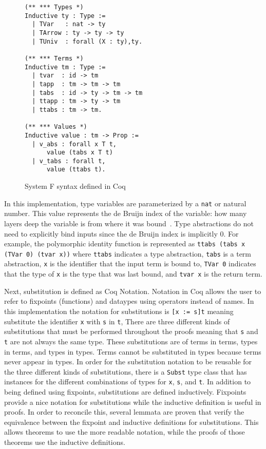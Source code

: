 \documentclass{sig-alternate}
\begin{document}
\begin{figure}[h!]
\begin{lstlisting}
(** *** Types *)
Inductive ty : Type := 
  | TVar   : nat -> ty 
  | TArrow : ty -> ty -> ty
  | TUniv  : forall (X : ty),ty.

(** *** Terms *)
Inductive tm : Type :=
  | tvar  : id -> tm
  | tapp  : tm -> tm -> tm
  | tabs  : id -> ty -> tm -> tm
  | ttapp : tm -> ty -> tm
  | ttabs : tm -> tm.

(** *** Values *)
Inductive value : tm -> Prop :=
  | v_abs : forall x T t,
      value (tabs x T t)
  | v_tabs : forall t,
      value (ttabs t).

\end{lstlisting}
\caption{System F syntax defined in Coq}
\label{fig:syntax-coq}
\end{figure}
In this implementation, type variables are parameterized by a \texttt{nat} or natural number. This value represents the de Bruijn index of the variable: how many layers deep the variable is from where it was bound~\cite{Vouillon12}. Type abstractions do not need to explicitly bind inputs since the de Bruijn index is implicitly 0. For example, the polymorphic identity function is represented as \texttt{ttabs (tabs x (TVar 0) (tvar x))} where \texttt{ttabs} indicates a type abstraction, \texttt{tabs} is a term abstraction, \texttt{x} is the identifier that the input term is bound to, \texttt{TVar 0} indicates that the type of \texttt{x} is the type that was last bound, and \texttt{tvar x} is the return term.

Next, substitution is defined as Coq Notation. Notation in Coq allows the user to refer to fixpoints (functions) and dataypes using operators instead of names. In this implementation the notation for substitutions is \texttt{[x := s]t} meaning substitute the identifier \texttt{x} with \texttt{s} in \texttt{t}, There are three different kinds of substitutions that must be performed throughout the proofs meaning that \texttt{s} and \texttt{t} are not always the same type. These substitutions are of terms in terms, types in terms, and types in types. Terms cannot be substituted in types because terms never appear in types. In order for the substitution notation to be reusable for the three different kinds of substitutions, there is a \texttt{Subst} type class that has instances for the different combinations of types for \texttt{x}, \texttt{s}, and \texttt{t}. In addition to being defined using fixpoints, substitutions are defined inductively. Fixpoints provide a nice notation for substitutions while the inductive definition is useful in proofs. In order to reconcile this, several lemmata are proven that verify the equivalence between the fixpoint and inductive definitions for substitutions. This allows theorems to use the more readable notation, while the proofs of those theorems use the inductive definitions.
\end{document}
